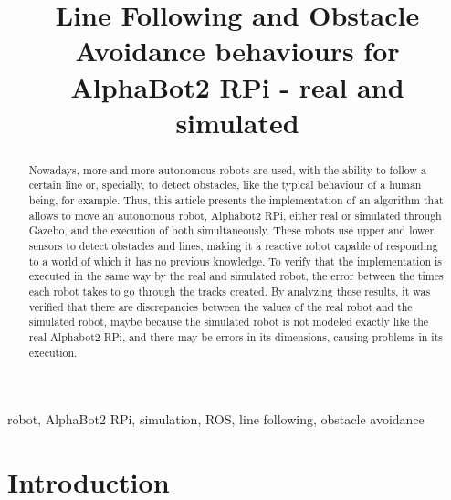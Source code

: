 \documentclass[conference]{IEEEtran}
\begin{document}
\title{Line Following and Obstacle Avoidance behaviours for AlphaBot2 RPi - real and simulated}

\author{
\and
{}
}

\maketitle

\begin{abstract}
Nowadays, more and more autonomous robots are used, with the ability to follow a certain line or, specially, to detect obstacles, like the typical behaviour of a human being, for example. Thus, this article presents the implementation of an algorithm that allows to move an autonomous robot, Alphabot2 RPi, either real or simulated through Gazebo, and the execution of both simultaneously. These robots use upper and lower sensors to detect obstacles and lines, making it a reactive robot capable of responding to a world of which it has no previous knowledge. To verify that the implementation is executed in the same way by the real and simulated robot, the error between the times each robot takes to go through the tracks created. By analyzing these results, it was verified that there are discrepancies between the values of the real robot and the simulated robot, maybe because the simulated robot is not modeled exactly like the real Alphabot2 RPi, and there may be errors in its dimensions, causing problems in its execution.
\end{abstract}

\begin{IEEEkeywords}
robot, AlphaBot2 RPi, simulation, ROS, line following, obstacle avoidance
\end{IEEEkeywords}

\section{Introduction} \label{intro}
\end{document}
